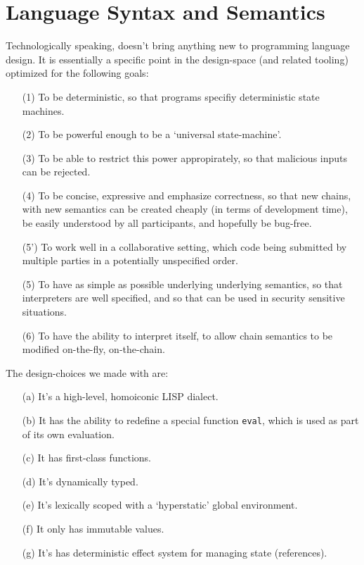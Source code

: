 \section{Language Syntax and Semantics}
\label{s:language}

Technologically speaking, \rad doesn't bring anything new to programming
language design. It is essentially a specific point in the design-space (and
related tooling) optimized for the following goals:
\begin{itemize}
\item[(1)] To be deterministic, so that \rad programs specifiy deterministic
  state machines.
\item[(2)] To be powerful enough to be a `universal state-machine'.
\item[(3)] To be able to restrict this power appropirately, so that malicious
  inputs can be rejected.
\item[(4)] To be concise, expressive and emphasize correctness, so that new
  chains, with new semantics can be created cheaply (in terms of development
  time), be easily understood by all participants, and hopefully be bug-free.
\item[(5')] To work well in a collaborative setting, which code being submitted
  by multiple parties in a potentially unspecified order.
\item[(5)] To have as simple as possible underlying underlying semantics, so
  that \rad interpreters are well specified, and so that \rad can be used in
  security sensitive situations.
\item[(6)] To have the ability to interpret itself, to allow chain semantics to
  be modified on-the-fly, on-the-chain.
\end{itemize}

The design-choices we made with \rad are:
\begin{itemize}
\item[(a)] It's a high-level, homoiconic LISP dialect.
\item[(b)] It has the ability to redefine a special function \texttt{eval}, which
  is used as part of its own evaluation.
\item[(c)] It has first-class functions.
\item[(d)] It's dynamically typed.
\item[(e)] It's lexically scoped with a `hyperstatic' global environment.
\item[(f)] It only has immutable values.
\item[(g)] It's has deterministic effect system for managing state (references).
\end{itemize}

